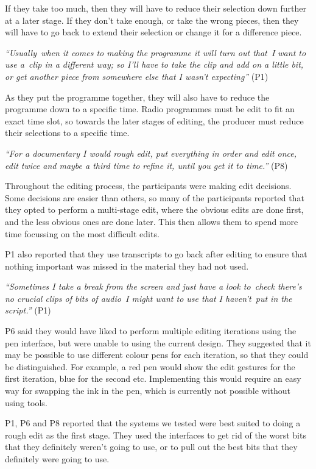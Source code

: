 If they take too much, then they will have to reduce their selection down further at a later stage. If they don't take
enough, or take the wrong pieces, then they will have to go back to extend their selection or change it for a
difference piece.

\textit{``Usually when it comes to making the programme it will turn out that I want to use a clip in a different way;
so I'll have to take the clip and add on a little bit, or get another piece from somewhere else that I wasn't
expecting''} (P1)

As they put the programme together, they will also have to reduce the programme down to a specific time. Radio
programmes must be edit to fit an exact time slot, so towards the later stages of editing, the producer must reduce
their selections to a specific time.

\textit{``For a documentary I would rough edit, put everything in order and edit once, edit twice and maybe a third
time to refine it, until you get it to time.''} (P8)

Throughout the editing process, the participants were making edit decisions. Some decisions are easier than others, so
many of the participants reported that they opted to perform a multi-stage edit, where the obvious edits are done
first, and the less obvious ones are done later. This then allows them to spend more time focussing on the most
difficult edits.

P1 also reported that they use transcripts to go back after editing to ensure that nothing important was missed in the
material they had not used.

\textit{``Sometimes I take a break from the screen and just have a look to check there's no crucial clips of bits of
audio I might want to use that I haven't put in the script.''} (P1)

P6 said they would have liked to perform multiple editing iterations using the pen interface, but were unable to using
the current design. They suggested that it may be possible to use different colour pens for each iteration, so that
they could be distinguished. For example, a red pen would show the edit gestures for the first iteration, blue for the
second etc. Implementing this would require an easy way for swapping the ink in the pen, which is currently not
possible without using tools.

P1, P6 and P8 reported that the systems we tested were best suited to doing a rough edit as the first stage.  They used
the interfaces to get rid of the worst bits that they definitely weren't going to use, or to pull out the best bits
that they definitely were going to use.

